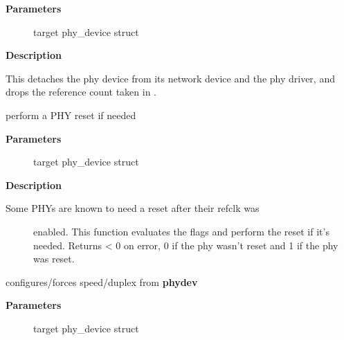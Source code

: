 \documentclass[a4paper,8pt,english]{sphinxmanual}
\begin{document}
\textbf{Parameters}
\begin{description}
\item[{}] \leavevmode
target phy\_device struct

\end{description}

\textbf{Description}

This detaches the phy device from its network device and the phy
driver, and drops the reference count taken in {\hyperref[networking/kapi:c.phy_attach_direct]{\emph{}}}.

\begin{fulllineitems}
\label{networking/kapi:c.phy_reset_after_clk_enable}
perform a PHY reset if needed

\end{fulllineitems}


\textbf{Parameters}
\begin{description}
\item[{}] \leavevmode
target phy\_device struct

\end{description}

\textbf{Description}
\begin{description}
\item[{Some PHYs are known to need a reset after their refclk was}] \leavevmode
enabled. This function evaluates the flags and perform the reset if it's
needed. Returns \textless{} 0 on error, 0 if the phy wasn't reset and 1 if the phy
was reset.

\end{description}

\begin{fulllineitems}
\label{networking/kapi:c.genphy_setup_forced}
configures/forces speed/duplex from \textbf{phydev}

\end{fulllineitems}


\textbf{Parameters}
\begin{description}
\item[{}] \leavevmode
target phy\_device struct

\end{description}
\end{document}
